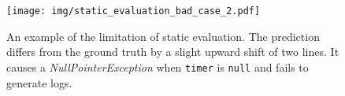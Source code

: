 \begin{figure}[t]
    \centering
    \texttt{[image: img/static\_evaluation\_bad\_case\_2.pdf]}
    \caption{An example of the limitation of static evaluation. The prediction differs from the ground truth by a slight upward shift of two lines. It causes a \textit{NullPointerException} when \texttt{timer} is \texttt{null} and fails to generate logs.}
    \label{fig:static_evaluation_bad_2}
\end{figure}

